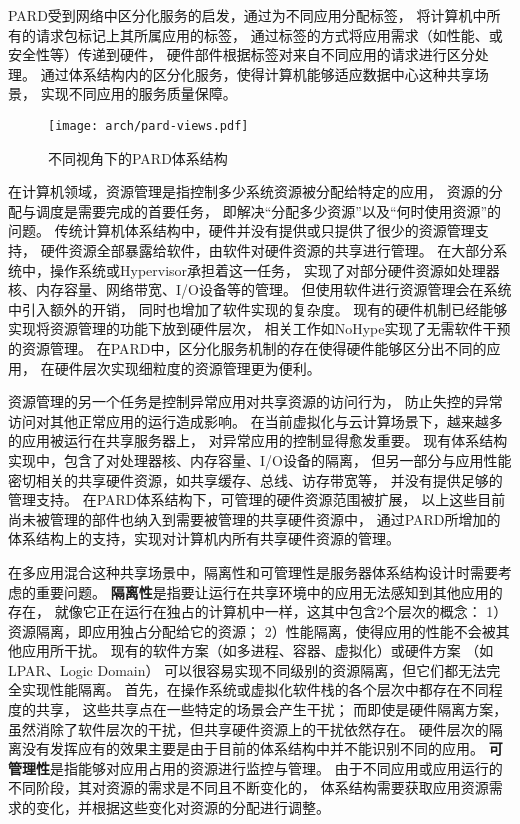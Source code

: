 PARD受到网络中区分化服务的启发，通过为不同应用分配标签，
将计算机中所有的请求包标记上其所属应用的标签，
通过标签的方式将应用需求（如性能、或安全性等）传递到硬件，
硬件部件根据标签对来自不同应用的请求进行区分处理。
通过体系结构内的区分化服务，使得计算机能够适应数据中心这种共享场景，
实现不同应用的服务质量保障。

\begin{figure}[t]
  \centering
  \texttt{[image: arch/pard-views.pdf]}
  \caption{不同视角下的PARD体系结构}
  \label{fig:pard-views}
\end{figure}

在计算机领域，资源管理是指控制多少系统资源被分配给特定的应用，
资源的分配与调度是需要完成的首要任务，
即解决``分配多少资源''以及``何时使用资源''的问题。
传统计算机体系结构中，硬件并没有提供或只提供了很少的资源管理支持，
硬件资源全部暴露给软件，由软件对硬件资源的共享进行管理。
在大部分系统中，操作系统或Hypervisor承担着这一任务，
实现了对部分硬件资源如处理器核、内存容量、网络带宽、I/O设备等的管理。
但使用软件进行资源管理会在系统中引入额外的开销\cite{xen-overhead2005,
Stadtmueller:2015, Reddy:2014}，
同时也增加了软件实现的复杂度。
现有的硬件机制已经能够实现将资源管理的功能下放到硬件层次，
相关工作如NoHype\cite{keller_nohype:_2010}实现了无需软件干预的资源管理。
在PARD中，区分化服务机制的存在使得硬件能够区分出不同的应用，
在硬件层次实现细粒度的资源管理更为便利。



资源管理的另一个任务是控制异常应用对共享资源的访问行为，
防止失控的异常访问对其他正常应用的运行造成影响。
在当前虚拟化与云计算场景下，越来越多的应用被运行在共享服务器上，
对异常应用的控制显得愈发重要。
现有体系结构实现中，包含了对处理器核、内存容量、I/O设备的隔离，
但另一部分与应用性能密切相关的共享硬件资源，如共享缓存、总线、访存带宽等，
并没有提供足够的管理支持。
在PARD体系结构下，可管理的硬件资源范围被扩展，
以上这些目前尚未被管理的部件也纳入到需要被管理的共享硬件资源中，
通过PARD所增加的体系结构上的支持，实现对计算机内所有共享硬件资源的管理。

在多应用混合这种共享场景中，隔离性和可管理性是服务器体系结构设计时需要考虑的重要问题。
\textbf{隔离性}是指要让运行在共享环境中的应用无法感知到其他应用的存在，
就像它正在运行在独占的计算机中一样，这其中包含2个层次的概念：
1）资源隔离，即应用独占分配给它的资源；
2）性能隔离，使得应用的性能不会被其他应用所干扰。
现有的软件方案（如多进程、容器、虚拟化）或硬件方案
（如LPAR\cite{IBM_LPAR:2007}、Logic Domain\cite{LDom}）
可以很容易实现不同级别的资源隔离，但它们都无法完全实现性能隔离。
首先，在操作系统或虚拟化软件栈的各个层次中都存在不同程度的共享，
这些共享点在一些特定的场景会产生干扰；
而即使是硬件隔离方案，虽然消除了软件层次的干扰，但共享硬件资源上的干扰依然存在。
硬件层次的隔离没有发挥应有的效果主要是由于目前的体系结构中并不能识别不同的应用。
\textbf{可管理性}是指能够对应用占用的资源进行监控与管理。
由于不同应用或应用运行的不同阶段，其对资源的需求是不同且不断变化的，
体系结构需要获取应用资源需求的变化，并根据这些变化对资源的分配进行调整。

